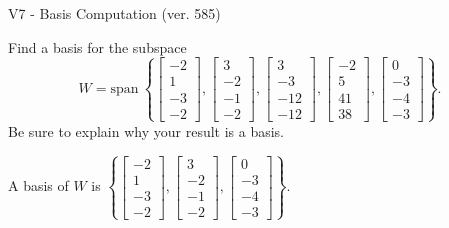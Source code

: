 \begin{exercise}
  \begin{exerciseTitle}V7 - Basis Computation (ver. 585)\end{exerciseTitle}
  \begin{exerciseStatement}
    Find a basis for the subspace 
\[W=\mathrm{span}\ \left\{\left[\begin{array}{r}
-2 \\
1 \\
-3 \\
-2
\end{array}\right] , \left[\begin{array}{r}
3 \\
-2 \\
-1 \\
-2
\end{array}\right] , \left[\begin{array}{r}
3 \\
-3 \\
-12 \\
-12
\end{array}\right] , \left[\begin{array}{r}
-2 \\
5 \\
41 \\
38
\end{array}\right] , \left[\begin{array}{r}
0 \\
-3 \\
-4 \\
-3
\end{array}\right]\right\}.\]
 Be sure to explain why your result is a basis.


  \end{exerciseStatement}
  \begin{exerciseAnswer}
   A basis of \(W\) is  \(\left\{\left[\begin{array}{r}
-2 \\
1 \\
-3 \\
-2
\end{array}\right] , \left[\begin{array}{r}
3 \\
-2 \\
-1 \\
-2
\end{array}\right] , \left[\begin{array}{r}
0 \\
-3 \\
-4 \\
-3
\end{array}\right]\right\}\).
  


  \end{exerciseAnswer}
\end{exercise}